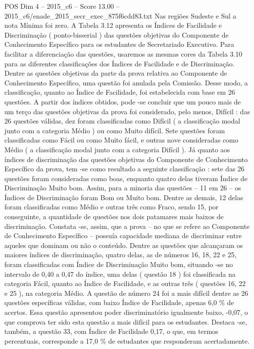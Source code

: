 \begin{textsample}{POS Dim 4 – 2015\_c6 – Score 13.00 – 2015\_c6/enade\_2015\_secr\_exec\_875f6cdd83.txt}
Nas regiões Sudeste e Sul a nota Mínima foi zero.
A Tabela 3.12 apresenta os Índices de Facilidade e Discriminação ( ponto-bisserial ) das questões objetivas do Componente de Conhecimento Específico para os estudantes de Secretariado Executivo.
Para facilitar a diferenciação das questões, usaremos as mesmas cores da Tabela 3.10 para as diferentes classificações dos Índices de Facilidade e de Discriminação.
Dentre as questões objetivas da parte da prova relativa ao Componente de Conhecimento Específico, uma questão foi anulada pela Comissão.
Desse modo, a classificação, quanto ao Índice de Facilidade, foi estabelecida com base em 26 questões.
A partir dos índices obtidos, pode -se concluir que um pouco mais de um terço das questões objetivas da prova foi considerado, pelo menos, Difícil : das 26 questões válidas, dez foram classificadas como Difícil ( a classificação modal junto com a categoria Médio ) ou como Muito difícil.
Sete questões foram classificadas como Fácil ou como Muito fácil, e outras nove consideradas como Médio ( a classificação modal junto com a categoria Difícil ).
Já quanto aos índices de discriminação das questões objetivas do Componente de Conhecimento Específico da prova, tem -se como resultado a seguinte classificação : sete das 26 questões foram consideradas como boas, enquanto quatro delas tiveram Índice de Discriminação Muito bom.
Assim, para a minoria das questões – 11 em 26 – os Índices de Discriminação foram Bom ou Muito bom.
Dentre as demais, 12 delas foram classificadas como Médio e outras três como Fraco, sendo 15, por conseguinte, a quantidade de questões nos dois patamares mais baixos de discriminação.
Constata -se, assim, que a prova – no que se refere ao Componente de Conhecimento Específico – possuía capacidade mediana de discriminar entre aqueles que dominam ou não o conteúdo.
Dentre as questões que alcançaram os maiores índices de discriminação, quatro delas, as de números 16, 18, 22 e 25, foram classificadas com Índice de Discriminação Muito bom, situando -se no intervalo de 0,40 a 0,47 do índice, uma delas ( questão 18 ) foi classificada na categoria Fácil, quanto ao Índice de Facilidade, e as outras três ( questões 16, 22 e 25 ), na categoria Médio.
A questão de número 24 foi a mais difícil dentre as 26 questões específicas válidas, com baixo Índice de Facilidade, apenas 6,0 \% de acertos.
Essa questão apresentou poder discriminatório igualmente baixo, -0,07, o que comprova ter sido esta questão a mais difícil para os estudantes.
Destaca -se, também, a questão 33, com Índice de Facilidade 0,17, o que, em termos percentuais, corresponde a 17,0 \% de estudantes que responderam acertadamente.

\end{textsample}
